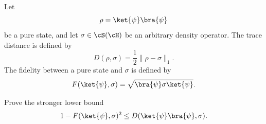 Let
$$
\rho=\ket{\psi}\bra{\psi}
$$
be a pure state, and let $\sigma\in \cS(\cH)$ be an arbitrary density operator. The trace distance is defined by
$$
D(\rho,\sigma)
=
\frac{1}{2}\|\rho-\sigma\|_1.
$$
The fidelity between a pure state and $\sigma$ is defined by
$$
F(\ket{\psi},\sigma)
=
\sqrt{\bra{\psi}\sigma\ket{\psi}}.
$$

Prove the stronger lower bound
$$
1-F(\ket{\psi},\sigma)^2
\leq
D(\ket{\psi}\bra{\psi},\sigma).
$$
